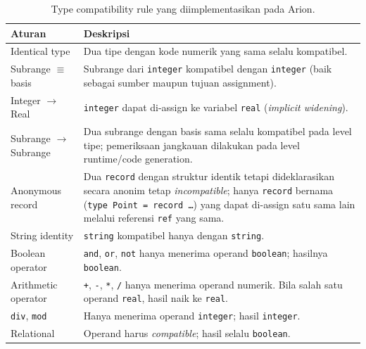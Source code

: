 \documentclass[11pt,a4paper]{article}
\begin{document}
\renewcommand{\arraystretch}{1.15}
\begin{table}[H]
\centering
\footnotesize
\begin{tabularx}{\textwidth}{l X}
\toprule
\textbf{Aturan} & \textbf{Deskripsi} \\
\midrule
Identical type      & Dua tipe dengan kode numerik yang sama selalu
                      kompatibel. \\
Subrange $\equiv$ basis & Subrange dari \texttt{integer} kompatibel dengan
                      \texttt{integer} (baik sebagai sumber maupun tujuan
                      assignment). \\
Integer $\to$ Real  & \texttt{integer} dapat di-assign ke variabel \texttt{real}
                      (\textit{implicit widening}). \\
Subrange $\to$ Subrange & Dua subrange dengan basis sama selalu kompatibel
                      pada level tipe; pemeriksaan jangkauan dilakukan pada
                      level runtime/code generation. \\
Anonymous record    & Dua \texttt{record} dengan struktur identik tetapi
                      dideklarasikan secara anonim tetap \textit{incompatible};
                      hanya \texttt{record} bernama (\texttt{type
                      Point = record \dots}) yang dapat di-assign satu sama
                      lain melalui referensi \texttt{ref} yang sama. \\
String identity     & \texttt{string} kompatibel hanya dengan \texttt{string}.
                      \\
Boolean operator    & \texttt{and}, \texttt{or}, \texttt{not} hanya menerima
                      operand \texttt{boolean}; hasilnya \texttt{boolean}. \\
Arithmetic operator & \texttt{+}, \texttt{-}, \texttt{*}, \texttt{/} hanya
                      menerima operand numerik. Bila salah satu operand
                      \texttt{real}, hasil naik ke \texttt{real}. \\
\texttt{div}, \texttt{mod} & Hanya menerima operand \texttt{integer}; hasil
                      \texttt{integer}. \\
Relational          & Operand harus \textit{compatible}; hasil selalu
                      \texttt{boolean}. \\
\bottomrule
\end{tabularx}
\caption{Type compatibility rule yang diimplementasikan pada Arion.}
\label{tab:type-rules}
\end{table}
\renewcommand{\arraystretch}{1.05}
\end{document}
